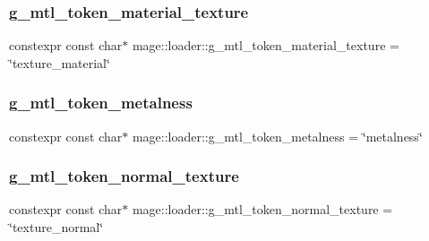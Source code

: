 \hypertarget{namespacemage_1_1loader_af1ed85cb87e80c34827df3cc89962064}{}\label{namespacemage_1_1loader_af1ed85cb87e80c34827df3cc89962064} 
\subsubsection{\texorpdfstring{g\+\_\+mtl\+\_\+token\+\_\+material\+\_\+texture}{g\_mtl\_token\_material\_texture}}
{\footnotesize\ttfamily constexpr const char$\ast$ mage\+::loader\+::g\+\_\+mtl\+\_\+token\+\_\+material\+\_\+texture = \char`\"{}texture\+\_\+material\char`\"{}}

\hypertarget{namespacemage_1_1loader_ad258922af6fd7f78c5a41e7ab3c47687}{}\label{namespacemage_1_1loader_ad258922af6fd7f78c5a41e7ab3c47687} 
\subsubsection{\texorpdfstring{g\+\_\+mtl\+\_\+token\+\_\+metalness}{g\_mtl\_token\_metalness}}
{\footnotesize\ttfamily constexpr const char$\ast$ mage\+::loader\+::g\+\_\+mtl\+\_\+token\+\_\+metalness = \char`\"{}metalness\char`\"{}}

\hypertarget{namespacemage_1_1loader_a48b11cb6763019a474d607b54a6197fa}{}\label{namespacemage_1_1loader_a48b11cb6763019a474d607b54a6197fa} 
\subsubsection{\texorpdfstring{g\+\_\+mtl\+\_\+token\+\_\+normal\+\_\+texture}{g\_mtl\_token\_normal\_texture}}
{\footnotesize\ttfamily constexpr const char$\ast$ mage\+::loader\+::g\+\_\+mtl\+\_\+token\+\_\+normal\+\_\+texture = \char`\"{}texture\+\_\+normal\char`\"{}}

\hypertarget{namespacemage_1_1loader_a4eabd854cf57ce6c1fcd49eed85230dd}{}\label{namespacemage_1_1loader_a4eabd854cf57ce6c1fcd49eed85230dd} 
